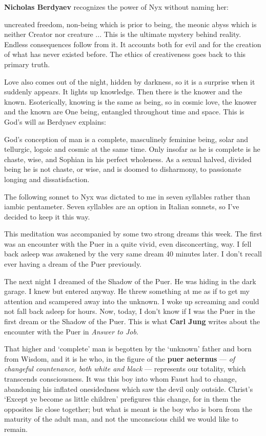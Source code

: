 \textbf{Nicholas Berdyaev} recognizes the power of Nyx without naming her:

\begin{quotex}
uncreated freedom, non-being which is prior to being, the meonic abyss which is neither Creator nor creature ... This is the ultimate mystery behind reality. Endless consequences follow from it. It accounts both for evil and for the creation of what has never existed before. The ethics of creativeness goes back to this primary truth.
\end{quotex}


Love also comes out of the night, hidden by darkness, so it is a surprise when it suddenly appears. It lights up knowledge. Then there is the knower and the known. Esoterically, knowing is the same as being, so in cosmic love, the knower and the known are One being, entangled throughout time and space. This is God's will as Berdyaev explains:

\begin{quotex}
God's conception of man is a complete, masculinely feminine being, solar and tellurgic, logoic and cosmic at the same time. Only insofar as he is complete is he chaste, wise, and Sophian in his perfect wholeness. As a sexual halved, divided being he is not chaste, or wise, and is doomed to disharmony, to passionate longing and dissatisfaction.
\end{quotex}


The following sonnet to Nyx was dictated to me in seven syllables rather than iambic pentameter. Seven syllables are an option in Italian sonnets, so I've decided to keep it this way.

This meditation was accompanied by some two strong dreams this week. The first was an encounter with the Puer in a quite vivid, even disconcerting, way. I fell back asleep was awakened by the very same dream 40 minutes later. I don't recall ever having a dream of the Puer previously.

The next night I dreamed of the Shadow of the Puer. He was hiding in the dark garage. I knew but entered anyway. He threw something at me as if to get my attention and scampered away into the unknown. I woke up screaming and could not fall back asleep for hours. Now, today, I don't know if I was the Puer in the first dream or the Shadow of the Puer. This is what \textbf{Carl Jung} writes about the encounter with the Puer in \emph{Answer to Job}.

\begin{quotex}
That higher and `complete' man is begotten by the `unknown' father and born from Wisdom, and it is he who, in the figure of the \textbf{puer aeternus} --- \emph{of changeful countenance, both white and black} --- represents our totality, which transcends consciousness. It was this boy into whom Faust had to change, abandoning his inflated onesidedness which saw the devil only outside. Christ's `Except ye become as little children' prefigures this change, for in them the opposites lie close together; but what is meant is the boy who is born from the maturity of the adult man, and not the unconscious child we would like to remain.
\end{quotex}


